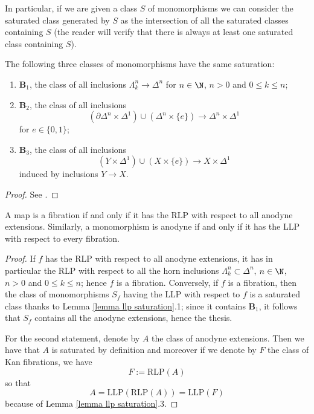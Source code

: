 \begin{refsection}
In particular, if we are given a class $S$ of monomorphisms we can consider the saturated class generated by $S$ as the intersection of all the saturated classes containing $S$ (the reader will verify that there is always at least one saturated class containing $S$).

\begin{thm} \label{thm anodyne}
The following three classes of monomorphisms have the same saturation:
\begin{enumerate}
\item $\mathbf B_1$, the class of all inclusions $\Lambda^n_k \to \Delta^n$ for $n \in \N$, $n > 0$ and $0 \le k \le n$;
\item $\mathbf B_2$, the class of all inclusions
\[
(\partial \Delta^n \times \Delta^1) \cup (\Delta^n \times \{e\}) \to \Delta^n \times \Delta^1
\]
for $e \in \{0,1\}$;
\item $\mathbf B_3$, the class of all inclusions
\[
(Y \times \Delta^1) \cup (X \times \{e\}) \to X \times \Delta^1
\]
induced by inclusions $Y \to X$.
\end{enumerate}
\end{thm}

\begin{proof}
See \cite[Proposition I.4.2]{gj}.
\end{proof}

\begin{cor} \label{cor anodyne 1}
A map is a fibration if and only if it has the RLP with respect to all anodyne extensions. Similarly, a monomorphism is anodyne if and only if it has the LLP with respect to every fibration.
\end{cor}

\begin{proof}
If $f$ has the RLP with respect to all anodyne extensions, it has in particular the RLP with respect to all the horn inclusions $\Lambda^n_k \subset \Delta^n$, $n \in \N$, $n > 0$ and $0 \le k \le n$; hence $f$ is a fibration. Conversely, if $f$ is a fibration, then the class of monomorphisms $S_f$ having the LLP with respect to $f$ is a saturated class thanks to Lemma \ref{lemma llp saturation}.1; since it contains $\mathbf B_1$, it follows that $S_f$ contains all the anodyne extensions, hence the thesis.

For the second statement, denote by $A$ the class of anodyne extensions. Then we have that $A$ is saturated by definition and moreover if we denote by $F$ the class of Kan fibrations, we have
\[
F := \mathrm{RLP}(A)
\]
so that
\[
A = \mathrm{LLP}(\mathrm{RLP}(A)) = \mathrm{LLP}(F)
\]
because of Lemma \ref{lemma llp saturation}.3.
\end{proof}


\end{refsection}
